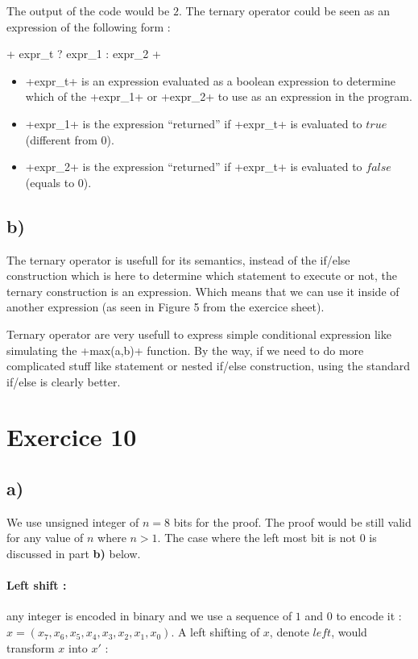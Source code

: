 \documentclass[a4paper,11pt]{report}
\begin{document}
The output of the code would be $2$. The ternary operator could be seen as an
expression of the following form :

\cinline+   expr_t ? expr_1 : expr_2 +

\begin{itemize}
\item \cinline+expr_t+ is an expression evaluated as a boolean expression to
  determine which of the \cinline+expr_1+ or \cinline+expr_2+ to use as an
  expression in the program.
\item \cinline+expr_1+ is the expression ``returned'' if \cinline+expr_t+ is
  evaluated to $true$ (different from $0$).
\item \cinline+expr_2+ is the expression ``returned'' if \cinline+expr_t+ is
  evaluated to $false$ (equals to $0$).
\end{itemize}

\subsection*{b)}

The ternary operator is usefull for its semantics, instead of the if/else
construction which is here to determine which statement to execute or not, the
ternary construction is an expression. Which means that we can use it inside of
another expression (as seen in Figure 5 from the exercice sheet).

Ternary operator are very usefull to express simple conditional expression like
simulating the \cinline+max(a,b)+ function. By the way, if we need to do more
complicated stuff like statement or nested if/else construction, using the
standard if/else is clearly better.

\section*{Exercice 10}

\subsection*{a)}

We use unsigned integer of $n = 8$ bits for the proof. The proof would be still
valid for any value of $n$ where $n > 1$. The case where the left most bit is
not $0$ is discussed in part \textbf{b)} below.

\paragraph{Left shift : } any integer is encoded in binary and we use a sequence
of $1$ and $0$ to encode it : $x = (x_7,x_6,x_5,x_4,x_3,x_2,x_1,x_0)$. A left
shifting of $x$, denote $left$, would transform $x$ into $x'$ :
\end{document}

